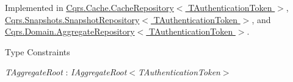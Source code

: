 Implemented in \hyperlink{classCqrs_1_1Cache_1_1CacheRepository_a69df7ee1dc2e4cd38431ab987655eab3_a69df7ee1dc2e4cd38431ab987655eab3}{Cqrs.\+Cache.\+Cache\+Repository$<$ T\+Authentication\+Token $>$}, \hyperlink{classCqrs_1_1Snapshots_1_1SnapshotRepository_a4a7484e7754cae876f0c04e640eb80ff_a4a7484e7754cae876f0c04e640eb80ff}{Cqrs.\+Snapshots.\+Snapshot\+Repository$<$ T\+Authentication\+Token $>$}, and \hyperlink{classCqrs_1_1Domain_1_1AggregateRepository_aff9e828d19a091a4275f635bee4b3c9b_aff9e828d19a091a4275f635bee4b3c9b}{Cqrs.\+Domain.\+Aggregate\+Repository$<$ T\+Authentication\+Token $>$}.

\begin{Desc}
\item[Type Constraints]\begin{description}
\item[{\em T\+Aggregate\+Root} : {\em I\+Aggregate\+Root$<$T\+Authentication\+Token$>$}]\end{description}
\end{Desc}
